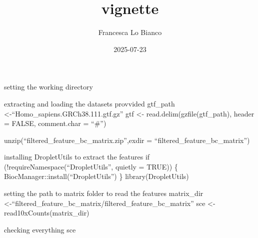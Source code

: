 \documentclass[
  ignorenonframetext,
]{beamer}
\title{vignette}
\author{Francesca Lo Bianco}
\date{2025-07-23}
\begin{document}
\frame{\titlepage}

\begin{frame}
\begin{block}{setting the working directory}
\label{setting-the-working-directory}
\end{block}

\begin{block}{extracting and loading the datasets provvided}
\label{extracting-and-loading-the-datasets-provvided}
gtf\_path \textless-``Homo\_sapiens.GRCh38.111.gtf.gz'' gtf \textless-
read.delim(gzfile(gtf\_path), header = FALSE, comment.char = ``\#'')

unzip(``filtered\_feature\_bc\_matrix.zip'',exdir =
``filtered\_feature\_bc\_matrix'')
\end{block}

\begin{block}{installing DropletUtils to extract the features}
\label{installing-dropletutils-to-extract-the-features}
if (!requireNamespace(``DropletUtils'', quietly = TRUE)) \{
BiocManager::install(``DropletUtils'') \} library(DropletUtils)
\end{block}

\begin{block}{setting the path to matrix folder to read the features}
\label{setting-the-path-to-matrix-folder-to-read-the-features}
matrix\_dir
\textless-``filtered\_feature\_bc\_matrix/filtered\_feature\_bc\_matrix''
sce \textless- read10xCounts(matrix\_dir)
\end{block}

\begin{block}{checking everything}
\label{checking-everything}
sce
\end{block}
\end{frame}
\end{document}
